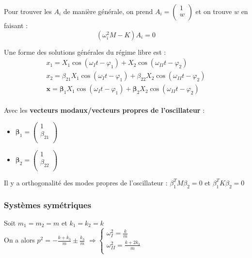 \documentclass[../main.tex]{subfiles}
\begin{document}
Pour trouver les $A_i$ de manière générale, on prend $A_i = \begin{pmatrix}
    1\\ w\\
\end{pmatrix}$ et on trouve $w$ en faisant : \begin{equation}
    (\omega_i^2M-K)A_i = 0
\end{equation}

Une forme des solutions générales du régime libre est : \begin{equation}
    \begin{gathered}
        x_1 = X_1 \cos(\omega_It-\varphi_1) + X_2\cos(\omega_{II}t-\varphi_2)\\
        x_2= \beta_{21}X_1 \cos(\omega_It-\varphi_1) + \beta_{22}X_2\cos(\omega_{II}t-\varphi_2)\\
        \mathbf{x} = \mathbf{\beta}_1X_1\cos(\omega_It-\varphi_1) + \mathbf{\beta}_2X_2\cos(\omega_{II}t-\varphi_2)\\
    \end{gathered}
\end{equation}

Avec les \textbf{vecteurs modaux/vecteurs propres de l'oscillateur} : \begin{itemize}
    \item $\mathbf{\beta}_1 = \begin{pmatrix}
        1\\ \beta_{21}\\
    \end{pmatrix}$\\
    \item $\mathbf{\beta}_2 = \begin{pmatrix}
        1\\ \beta_{22}\\
    \end{pmatrix}$
\end{itemize}

\warning Il y a orthogonalité des modes propres de l'oscillateur : $\beta_1^T M \beta_2 = 0$ et $\beta_1^TK\beta_2 = 0$\\

\justifying

\subsubsection{Systèmes symétriques}
Soit $m_1=m_2=m$ et $k_1=k_2=k$\\
On a alors $p^2 = -\frac{k+k_3}{m} \pm \frac{k_3}{m}$ $\Rightarrow \begin{cases}
    \omega_I^2 = \frac{k}{m}\\ \omega_{II}^2 = \frac{k+2k_3}{m}\\
\end{cases}$
\end{document}
